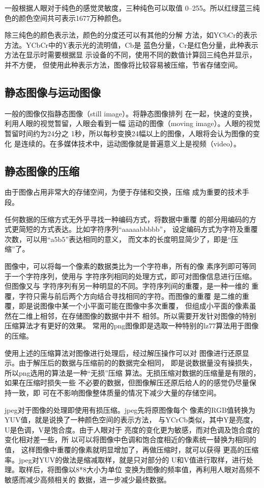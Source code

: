 \documentclass[11pt]{article}
\begin{document}
    一般根据人眼对于纯色的感觉灵敏度，三种纯色可以取值
0--255。所以红绿蓝三纯色的颜色空间共可表示1677万种颜色。

    除三纯色的颜色表示法，颜色的分度还可以有其他的分解
方法，如YCbCr的表示方法。YCbCr中的Y表示光的流明值，Cb是
蓝色分量，Cr是红色分量，此种表示方法在显示时需要根据显
示设备的不同，使用不同的数值计算回三纯色并显示，并不方便，
但使用此种表示方法，图像将比较容易被压缩，节省存储空间。
\subsection{静态图像与运动图像}
    一般的图像仅指静态图像（still image）。将静态图像排列
在一起，快速的变换，利用人眼的视觉暂留，人眼会看到一幅
运动的图像（moving image）。人眼的视觉暂留时间约为24分之
1秒，所以每秒变换24幅以上的图像，人眼将会认为图像的变化
是连续的。在多媒体技术中，运动图像就是普遍意义上是视频（video）。
\subsection{静态图像的压缩}
    由于图像占用非常大的存储空间，为便于存储和交换，压缩
成为重要的技术手段。
   
    任何数据的压缩方式无外乎寻找一种编码方式，将数据中重覆
的部分用编码的方式更简短的方式表达。比如字符序列``aaaaabbbbb''，
设定编码方式为字符及重覆次数，可以用``a5b5''表达相同的意义，
而文本的长度明显简少了，即是``压缩''了。

    图像中，可以将每一个像素的数据类比为一个字符串，所有的像
素序列即可等同于一个字符序列，使用与
字符序列相同的处理方式，即可对图像信息进行压缩。但图像又与
字符序列有另一种明显的不同。字符序列间的重覆，是一种一维的
重覆，字符只需与前后两个方向结合寻找相同的字符。而图像的重覆
是二维的重覆，即是说图像中某一个小平面可能在图像中多次重覆，
但组成小平面的像素虽然在二维上相邻，在存储图像的数据中并不
相邻。所以需要开发针对图像的特别压缩算法才有更好的效果。
常用的png图像即是选取一种特别的lz77算法用于图像的压缩。

    使用上述的压缩算法对图像进行处理后，经过解压操作可以对
图像进行还原显示。由于解压后的数据与压缩前的的数据完全相同，
即是说数据量没有操损失，所以png选用的算法是一种``无损''压缩
算法。无损压缩对数据的压缩量是有限的，如果在压缩时损失一些
不必要的数据，但图像解压还原后给人的的感觉仍尽量保持一致，即
可在不影响图像整体质量的情况下减少大量的存储空间。

    jpeg对于图像的处理即使用有损压缩。jpeg先将原图像每个
像素的RGB值转换为YUV值，就是说换了一种颜色空间的表示方法，
与YCrCb类似，其中Y是亮度，U是色调，V是饱合度。由于人眼对于
亮度的变化更为敏感，而对色调及饱合度的变化相对差一些，所
以可以将图像中色调和饱合度相近的像素统一替换为相同的值，
这样图像中重覆的像素就明显增加了，再做压缩时，就可以获得
更高的压缩率。jpeg对YUV的做法是缩减取样，就是只对部分的
U和V值进行取样，进行处理。取样后，将图像以8*8大小为单位
变换为图像的频率值，再利用人眼对高频不敏感而减少高频相关的
数据，进一步减少最终数据。
\end{document}
